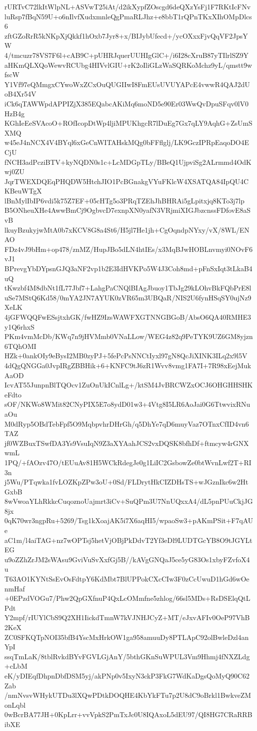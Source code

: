 rURTvC72lkItWlpNL+ASVwT25iAt/d2ikXypfZOscgd6deQXzYsFj1F7RKtIcFNv
luRsp7fBqN59U+o6nIlvfXudxmnleQgPmaRLJhz+e8bbT1rQPnTKxXIhOMpDlcs6
zftGZoRrR5kNKpXjQkkf1hOxb7Jyr8+x/BIJybUfecd+/ycOXxxFjvQqVF2JpsYW
4/tmcuzr78VS7F6l+cAB9C+pUHRJquerUUHIgGlC+/i6I28cXruB87yTIlrlSZ9Y
aHKmQLXQoWewvRCUbg4HIVvlGIU+rK2oIliGLzWaSQRKoMchz9yL/qmstt9wfscW
Y1Vf97eQMmgxCYwoWxZCxOuQUGIIwI8FmEUsUVUYAPcE4vwwR4QAJ2dUoB4Xr54V
iCk6qTAWWpdAPPIZjX385EQabcAKiMq6moND5e90Er03WwQvDpuSFqv0lV0HzB4g
KGhIeEeSVAcoO+ROfIcopDtWp4ljiMPUKhgcR7lDuEg7Gx7qLY9AqhG+ZsUmSXMQ
w45eJ4nNCX4V4BYql6xGeCnWITAHskMQg0bFFflglj/LK9GczIPRpEaqoDO4ECjU
fNCH3adPcziBTV+kyNQDN0s1c+LcMDGpTLy/BBeQ1UjpviSg2ALrmmd4OdKwj0ZU
JqrTWEXDQEqPHQDW5HtchJIO1PcBGnakgVYuFKlcW4XSATQA84IpQU4CKBeuWTgX
lBnMylIbIP6vdi5k75Z7EF+05cHTg5o3PRqTZEhJhBHRAi5gLpitxjq8KTo3j7lp
B5ONheuXHe4AwwBmCj9OgbvcD7exnpXN0yafN3VRjmiXIGJbzcnssFDfovE8aSvB
lkuyBzukyjwMtA0b7xKCV8G8a4St6/H5jl7He1jh+CgOqndpNYxy/vX/8WL/ENAO
FDz4vJ9bHm+op478/znMZ/HupJBo5dLN4htIEs/x3MqBJwHOBLnvmyi0NOvF6vJ1
BPrevgYbDYpsnGJQ3aNF2vp1b2E3IdHVKPo5W4J3Coh8md+pFnSxIqt3tLkaB4uQ
tKwzbf4M8dbNt1fL77Jbf7+LahgPaCNQlBIAgJbuoy1TbJg29kLOhvBkFQbPrE8l
uSe7MStQ6Kd58/0mYA2JN7AYUK0zVR65m3UBQaR/NIS2U6fynHSqSY0ujNz9XeLK
4jGFWQQFwESsjtxhGK/fwHZ9IzsWAWFXGTNNGBGoB/AbsO6QA40RMHE3y1Q6rhxS
PKm4vmMcDb/KWq7n9jHVMmb0VNaLLow/WEG4z82q9PeTYK9UZ6GM8yjzn6TQhOMI
HZk+0ankOIy9eBysI2MB0zyPJ+5fePcPsNNCtIyxl97gN8QcJiXINK3ILq2x9l5V
4dQgQNGGa0JvpIRgZBBHik+6+KNFC9tJ6zR1Wvv8vmg1FA7I+7R98xEejMukAaOD
IcvAT55JunpnBlTQOcv1ZuOnUkICnlLg+/ktSM4JvBRCWZxOCJ6OHGHHSHKeFdto
sOF/NKWo8WMit82CNyPIX5E7o8ydD01w3+4Vtg8I5LR6AoJai0G6TtwvixRNuaOu
M0dRyp5OBdTebFpf5O9MqbpvhrDHrGh/q5DhYe7qD6muyVaz7OTnxCfID4vn6TAZ
jf0WZBuxTSwfDA3Ys9VsuIqN9Z3aXYAahJCS2vxDQSK8bfhDf+ftmcyw4rGNXwmL
1PQ/+fAOzv47O/tEUuAv81H5WCkRdegJe0g1LiIC2GsbowZe0btWvnLwf2T+RI3n
j5Wu/PTqwka1fvLOZKpZPw3oU+0Sd/FLDrytHkCIZDHsTS+wJGznIkc6w2HtGxbB
8wVwoaYLhRkkcCuqoznoUajmrt3iCv+SuQPm3U7NnUQxxA4/dL5pnPUuCkjJG8jx
0qK70wr3ngpRu+5269/Tsg1kXoajAK5i7X6aqHI5/wpaoSw3+pAKmPSit+F7qAUe
aC1m/l4aiTAG+nz7wOPTsj5hetVjOBjPkDdvT2Yf3eDl9LUDTGcYB8O9tJGYLtEG
u9oZZhZrJM2sWAsu9GviVuSvXxfGj5B//kAVgGNQaJ5ce5yG83Os1xbyFZvfoX4u
T63AO1KYNtSsEvOsFdtpY6KdMbt7BlUPPokCXcCIw3F0zCcUwuD1hGd6wOenmHaf
+0EPzdVOGu7/Phw2QpGXfnuP4QxLcOMmfne5zhlog/66sl5MDs+RsDSElqQtLPdt
Y2mpf/rIUYlCbS9Q2XH1IickdTmnW7kVJNHJCyZ+MT/eJxvAFIv0OeP97VhB2KeX
ZC0SFKQTpNOI35bfB4YscMxHrkOW1ga958amuuDy8PTLApC92olBwleDzl4anYpI
ssqTmLaK/8tblRvkdBYvFGVLGjAnY/5bthGKnSuWPUL3Vm9Hhmj4fNXZLdg+cLbM
eK/yDIEqfDhpnDbfDSM5yj/akPNp0v5IxyN3ckP3FkG7WdKaDgsQoMyQ90C62Zab
/nmNvsvWHykUTDu3lXQwPDtkDOQHE4KbYkFTu7p2U8dC9oBrkl1BwkveZMonLqbl
0wBcrBA77JH+0KpLrr+vvVpkS2PmTxJc0U8IQAxoL5dEU97/QI8HG7CRaRRBibXE
